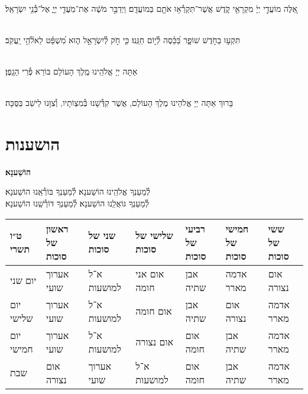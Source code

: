 \documentclass[twoside, openany, parskip=half, 11pt]{book}
\begin{document}
\\
אֵ֚לֶּה מוֹעֲדֵ֣י יְיָ֔ מִקְרָאֵ֖י קֹ֑דֶשׁ אֲשֶׁר־תִּקְרְ֯א֥וּ אֹתָ֖ם בְּמוֹעֲדָֽם׃ וַיְדַבֵּ֣ר מֹשֶׁ֔ה אֶת־מֹֽעֲדֵ֖י יְיָ֑ אֶל־בְּ֯נֵ֖י יִשְׂרָאֵֽל׃

\sepline

\\
תִּקְע֣וּ בַחֹ֣דֶשׁ שׁוֹפָ֑ר בַּ֝כֵּ֗סֶה לְ֯י֣וֹם חַגֵּֽנוּ׃ כִּ֤י חֹ֣ק לְ֯יִשְׂרָאֵ֣ל ה֑וּא מִ֝שְׁפָּ֗ט לֵאלֹ֘הֵ֥י יַֽעֲקֹֽב׃

\sepline

 \\

אַתָּה יְיָ אֱלֹהֵֽינוּ מֶֽלֶךְ הָעוֹלָם בּוֹרֵא פְּ֯רִי הַגָֽפֶן׃

\begin{sometimes}

\\
בָּרוּךְ אַתָּה יְיָ אֱלֹהֵינוּ מֶלֶךְ הָעוֹלָם, אֲשֶׁר קִדְּ֯שָׁנוּ בְּ֯מִצְוֹתָיו, וְ֯צִוָּנוּ לֵישֵׁב בַּסֻּכָּה׃\\
\end{sometimes}

\chapter[הושענות]{ הושענות }
\label{hoshanos}


\begin{Large}
\textbf{
הוֹשַׁענָא׃
}
\end{Large}


לְ֯מַעַנְךָ אֱלֹהֵֽינוּ הוֹשַׁענָא׃ לְ֯מַעַנְךָ בּוֹרְ֯אֵֽנוּ הוֹשַׁענָא׃\\
לְ֯מַעַנְךָ גּוֹאֲלֵֽנוּ הוֹשַׁענָא׃ לְ֯מַעַנְךָ דּוֹרְ֯שֵֽׁנוּ הוֹשַׁענָא׃

\begin{tiny}
\begin{tabular}{>{\centering\arraybackslash}m{}||>{\centering\arraybackslash}m{}|>{\centering\arraybackslash}m{}|>{\centering\arraybackslash}m{}|>{\centering\arraybackslash}m{}|>{\centering\arraybackslash}m{}|>{\centering\arraybackslash}m{}}
ט״ו תשרי & ראשון של סוכות & שני של סוכות & שלישי של סוכות & רביעי של סוכות & חמישי של סוכות & ששי של סוכות \\
\hline \hline
יום שני & אערוך שועי & א־ל למושעות & אום אני חומה & אבן שתיה & אדמה מארר & אום נצורה\\ \hline
יום שלישי & אערוך שועי & א־ל למושעות & אום חומה & אבן שתיה & אום נצורה & אדמה מארר \\ \hline
יום חמישי & אערוך שועי & א־ל למושעות & אום נצורה & אום חומה & אבן שתיה & אדמה מארר\\ \hline
שבת & אום נצורה & אערוך שועי & א־ל למושעות & אום חומה & אבן שתיה & אדמה מארר
\end{tabular}

\end{tiny}
\end{document}
